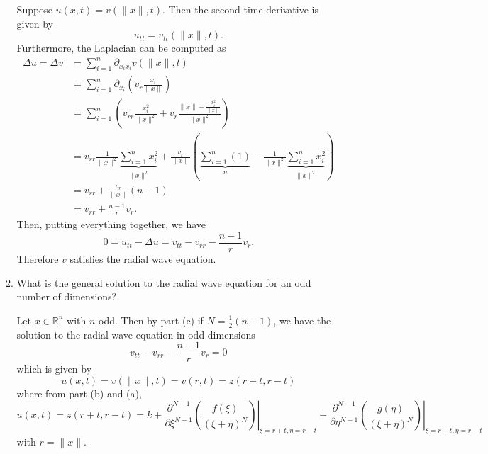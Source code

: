 \documentclass[a4paper,12pt]{article}
\newcommand{\reals}{\mathbb{R}}
\newcommand{\norm}[1]{\lVert #1 \rVert}
\begin{document}
\begin{enumerate}[label = \arabic*.]
\begin{enumerate}[label = (\alph*)]
		Suppose $ u(x, t) = v(\norm{x}, t) $. Then the second time derivative is given by
		\[
			u_{tt} = v_{tt}(\norm{x}, t).
		\]
		Furthermore, the Laplacian can be computed as
		\begin{align*}
			\Delta u = \Delta v &= \sum_{i = 1}^{n} \partial_{x_i x_i} v(\norm{x}, t) \\
			&= \sum_{i=1}^{n} \partial_{x_i} \left(v_r \frac{x_i}{\norm{x}}\right) \\
			&= \sum_{i = 1}^{n} \left(v_{rr} \frac{x_i^2}{\norm{x}^2} + v_r \frac{\norm{x} - \frac{x_i^2}{\norm{x}}}{\norm{x}^2}\right) \\
			&= v_{rr} \frac{1}{\norm{x}^2} \underbrace{\sum_{i = 1}^{n} x_i^2}_{\norm{x}^2} + \frac{v_r}{\norm{x}} \left(\underbrace{\sum_{i = 1}^{n} (1)}_n - \frac{1}{\norm{x}^2} \underbrace{\sum_{i = 1}^{n}x_i^2}_{\norm{x}^2}\right) \\
			&= v_{rr} + \frac{v_r}{\norm{x}}(n - 1) \\
			&= v_{rr} + \frac{n - 1}{r}v_r.
		\end{align*}
		Then, putting everything together, we have
		\[
			0 = u_{tt} - \Delta u = v_{tt} - v_{rr} - \frac{n - 1}{r}v_r.
		\]
		Therefore $ v $ satisfies the radial wave equation.
		
		\item What is the general solution to the radial wave equation for an odd number of dimensions?
		
		Let $ x \in \reals^n $ with $ n $ odd. Then by part (c) if $ N = \frac{1}{2} (n - 1) $, we have the solution to the radial wave equation in odd dimensions
		\[
			v_{tt} - v_{rr} - \frac{n - 1}{r} v_r = 0
		\]
		which is given by
		\[
			u(x, t) = v(\norm{x}, t) = v(r, t) = z(r + t, r - t)
		\]
		where from part (b) and (a),
		\[
			u(x,t) = z(r + t, r - t) = k + \left.\frac{\partial^{N - 1}}{\partial \xi^{N - 1}} \left(\frac{f(\xi)}{(\xi + \eta)^N}\right)\right|_{\xi = r + t, \eta = r - t} + \left.\frac{\partial^{N - 1}}{\partial \eta^{N - 1}} \left(\frac{g(\eta)}{(\xi + \eta)^N}\right)\right|_{\xi = r + t, \eta = r - t}
		\]
		with $ r = \norm{x} $.
	\end{enumerate}
\end{enumerate}
\end{document}
